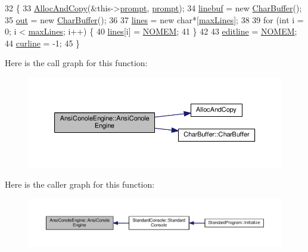 \begin{DoxyCode}
32 \{
33     \hyperlink{clib_8h_a5bed05c70cb17e541fee570b5dc32e1a}{AllocAndCopy}(&this->\hyperlink{classAnsiConoleEngine_a97ebef63ba0490711ed78733b6a87be5}{prompt}, \hyperlink{classAnsiConoleEngine_a97ebef63ba0490711ed78733b6a87be5}{prompt});
34     \hyperlink{classAnsiConoleEngine_a6bf88afa72a458e3687972f9e666cd86}{linebuf} = \textcolor{keyword}{new} \hyperlink{classCharBuffer}{CharBuffer}();
35     \hyperlink{classAnsiConoleEngine_ad6a604fc0a0f544907513076c72434f3}{out} = \textcolor{keyword}{new} \hyperlink{classCharBuffer}{CharBuffer}();
36 
37     \hyperlink{classAnsiConoleEngine_a624ec5321c326a68de340f9b77e84c2c}{lines} = \textcolor{keyword}{new} \textcolor{keywordtype}{char}*[\hyperlink{classAnsiConoleEngine_a3f94786b1610ac3f038d5115fd8047a3}{maxLines}];
38 
39     \textcolor{keywordflow}{for} (\textcolor{keywordtype}{int} i = 0; i < \hyperlink{classAnsiConoleEngine_a3f94786b1610ac3f038d5115fd8047a3}{maxLines}; i++) \{
40         \hyperlink{classAnsiConoleEngine_a624ec5321c326a68de340f9b77e84c2c}{lines}[i] = \hyperlink{platform_8h_a46ff2bfbf0d44b8466a2251d5bd5e6f8}{NOMEM};
41     \}
42 
43     \hyperlink{classAnsiConoleEngine_a465421c5488f2566d12717641a327017}{editline} = \hyperlink{platform_8h_a46ff2bfbf0d44b8466a2251d5bd5e6f8}{NOMEM};
44     \hyperlink{classAnsiConoleEngine_ab029fc4a19c5fbd6f6b23c390af618b8}{curline} = -1;
45 \}
\end{DoxyCode}


Here is the call graph for this function\+:
\nopagebreak
\begin{figure}[H]
\begin{center}
\leavevmode
\includegraphics[width=350pt]{df/d87/classAnsiConoleEngine_aac394a191db46deb09a08522bdf72218_cgraph}
\end{center}
\end{figure}




Here is the caller graph for this function\+:
\nopagebreak
\begin{figure}[H]
\begin{center}
\leavevmode
\includegraphics[width=350pt]{df/d87/classAnsiConoleEngine_aac394a191db46deb09a08522bdf72218_icgraph}
\end{center}
\end{figure}


